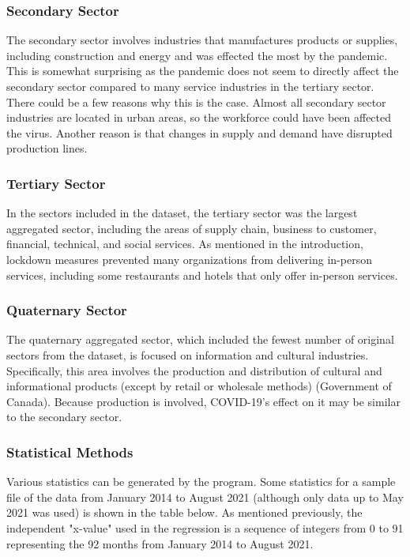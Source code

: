 \documentclass[fontsize=11pt]{article}
\begin{document}
\subsubsection*{Secondary Sector}
The secondary sector involves industries that manufactures products or supplies, including construction and energy and was effected the most by the pandemic.
This is somewhat surprising as the pandemic does not seem to directly affect the secondary sector compared to many service industries in the tertiary sector. There could be a few reasons why this is the case. Almost all secondary sector industries are located in urban areas, so the workforce could have been affected the virus. Another reason is that changes in supply and demand have disrupted production lines.

\subsubsection*{Tertiary Sector}
In the sectors included in the dataset, the tertiary sector was the largest aggregated sector, including the areas of supply chain, business to customer, financial, technical, and social services. As mentioned in the introduction, lockdown measures prevented many organizations from delivering in-person services, including some restaurants and hotels that only offer in-person services. 


\subsubsection*{Quaternary Sector}
The quaternary aggregated sector, which included the fewest number of original sectors from the dataset, is focused on information and cultural industries. Specifically, this area involves the production and distribution of cultural and informational products (except by retail or wholesale methods) (Government of Canada). Because production is involved, COVID-19's effect on it may be similar to the secondary sector.

\subsubsection*{Statistical Methods}

Various statistics can be generated by the program. Some statistics for a sample file of the data from January 2014 to August 2021 (although only data up to May 2021 was used) is shown in the table below. As mentioned previously, the independent "x-value" used in the regression is a sequence of integers from 0 to 91 representing the 92 months from January 2014 to August 2021.
\end{document}
